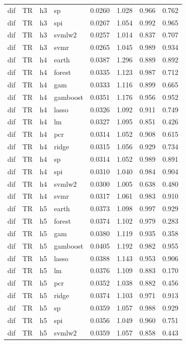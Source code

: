 \begin{ThreePartTable}
\begin{longtable}[t]{llclcccc}
dif & TR & h3 & sp & 0.0260 & 1.028 & 0.966 & 0.762\\
dif & TR & h3 & spi & 0.0267 & 1.054 & 0.992 & 0.965\\
dif & TR & h3 & svmlw2 & 0.0257 & 1.014 & 0.837 & 0.707\\
dif & TR & h3 & svmr & 0.0265 & 1.045 & 0.989 & 0.934\\
\addlinespace
dif & TR & h4 & earth & 0.0387 & 1.296 & 0.889 & 0.892\\
dif & TR & h4 & forest & 0.0335 & 1.123 & 0.987 & 0.712\\
dif & TR & h4 & gam & 0.0333 & 1.116 & 0.899 & 0.665\\
dif & TR & h4 & gamboost & 0.0351 & 1.176 & 0.956 & 0.952\\
dif & TR & h4 & lasso & 0.0326 & 1.092 & 0.911 & 0.749\\
dif & TR & h4 & lm & 0.0327 & 1.095 & 0.851 & 0.426\\
dif & TR & h4 & pcr & 0.0314 & 1.052 & 0.908 & 0.615\\
dif & TR & h4 & ridge & 0.0315 & 1.056 & 0.929 & 0.734\\
dif & TR & h4 & sp & 0.0314 & 1.052 & 0.989 & 0.891\\
dif & TR & h4 & spi & 0.0310 & 1.040 & 0.984 & 0.904\\
dif & TR & h4 & svmlw2 & 0.0300 & 1.005 & 0.638 & 0.480\\
dif & TR & h4 & svmr & 0.0317 & 1.061 & 0.983 & 0.910\\
\addlinespace
dif & TR & h5 & earth & 0.0373 & 1.098 & 0.997 & 0.929\\
dif & TR & h5 & forest & 0.0374 & 1.102 & 0.979 & 0.283\\
dif & TR & h5 & gam & 0.0380 & 1.119 & 0.935 & 0.358\\
dif & TR & h5 & gamboost & 0.0405 & 1.192 & 0.982 & 0.955\\
dif & TR & h5 & lasso & 0.0388 & 1.143 & 0.953 & 0.906\\
dif & TR & h5 & lm & 0.0376 & 1.109 & 0.883 & 0.170\\
dif & TR & h5 & pcr & 0.0352 & 1.038 & 0.882 & 0.456\\
dif & TR & h5 & ridge & 0.0374 & 1.103 & 0.971 & 0.913\\
dif & TR & h5 & sp & 0.0359 & 1.057 & 0.988 & 0.929\\
dif & TR & h5 & spi & 0.0356 & 1.049 & 0.960 & 0.751\\
dif & TR & h5 & svmlw2 & 0.0359 & 1.057 & 0.858 & 0.443\\

\end{longtable}
\end{ThreePartTable}
